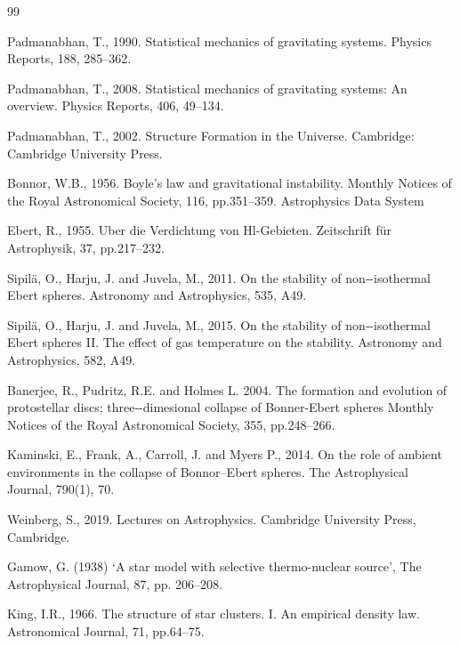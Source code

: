 \documentclass[12pt,a4paper]{article}
\numberwithin{equation}{section}
\begin{document}
\begin{thebibliography}{99}
\item Padmanabhan, T., 1990. Statistical mechanics of gravitating systems. Physics Reports, 188, 285–362.

\item Padmanabhan, T., 2008. Statistical mechanics of gravitating systems: An overview. Physics Reports, 406, 49–134.

\item Padmanabhan, T., 2002. Structure Formation in the Universe. Cambridge: Cambridge University Press.

\item Bonnor, W.B., 1956. Boyle’s law and gravitational instability. Monthly Notices of the Royal Astronomical Society, 116, pp.351–359.
Astrophysics Data System

\item Ebert, R., 1955. Uber die Verdichtung von Hl-Gebieten. Zeitschrift für Astrophysik, 37, pp.217–232.

\item Sipilä, O., Harju, J. and Juvela, M., 2011. On the stability of non‑-isothermal Ebert spheres. Astronomy and Astrophysics, 535, A49.


\item Sipilä, O., Harju, J. and Juvela, M., 2015. On the stability of non‑-isothermal Ebert spheres II. The effect of gas temperature on the stability. Astronomy and Astrophysics, 582, A49.

\item Banerjee, R., Pudritz, R.E. and Holmes L. 2004. The formation and evolution of protostellar discs; three‑-dimesional collapse of Bonner-Ebert spheres Monthly Notices of the Royal Astronomical Society, 355, pp.248–266.

\item Kaminski, E., Frank, A., Carroll, J. and Myers P., 2014. On the role of ambient environments in the collapse of Bonnor–Ebert spheres. The Astrophysical Journal, 790(1), 70.

\item Weinberg, S., 2019. Lectures on Astrophysics. Cambridge University Press, Cambridge.


\item Gamow, G. (1938) ‘A star model with selective thermo-nuclear source’, The Astrophysical Journal, 87, pp. 206–208.

\item  King, I.R., 1966. The structure of star clusters. I. An empirical density law. Astronomical Journal, 71, pp.64–75.


\end{thebibliography}
\end{document}

